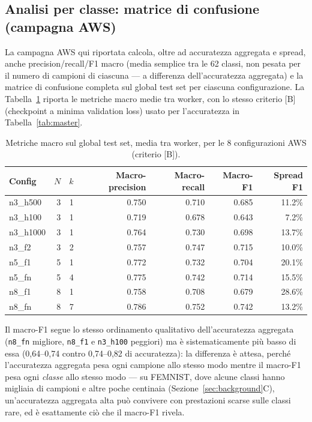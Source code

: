 \subsection{Analisi per classe: matrice di confusione (campagna AWS)}
La campagna AWS qui riportata calcola, oltre ad accuratezza aggregata e
spread, anche precision/recall/F1 macro (media semplice tra le 62 classi,
non pesata per il numero di campioni di ciascuna — a differenza
dell'accuratezza aggregata) e la matrice di confusione completa
sul global test set per ciascuna configurazione. La
Tabella~\ref{tab:macro} riporta le metriche macro medie tra worker, con lo
stesso criterio [B] (checkpoint a minima validation loss) usato per
l'accuratezza in Tabella~\ref{tab:master}.

\begin{table}[t]
  \centering
  \caption{Metriche macro sul global test set, media tra worker, per le 8 configurazioni AWS (criterio [B]).}
  \label{tab:macro}
  \scriptsize
  \begin{tabular}{lrrrrrr}
    \toprule
    \textbf{Config} & $N$ & $k$ & \textbf{Macro-precision} & \textbf{Macro-recall} & \textbf{Macro-F1} & \textbf{Spread F1} \\
    \midrule
    n3\_h500  & 3 & 1 & 0.750 & 0.710 & 0.685 & 11.2\% \\
    n3\_h100  & 3 & 1 & 0.719 & 0.678 & 0.643 & 7.2\%  \\
    n3\_h1000 & 3 & 1 & 0.764 & 0.730 & 0.698 & 13.7\% \\
    n3\_f2    & 3 & 2 & 0.757 & 0.747 & 0.715 & 10.0\% \\
    n5\_f1    & 5 & 1 & 0.772 & 0.732 & 0.704 & 20.1\% \\
    n5\_fn    & 5 & 4 & 0.775 & 0.742 & 0.714 & 15.5\% \\
    n8\_f1    & 8 & 1 & 0.758 & 0.708 & 0.679 & 28.6\% \\
    n8\_fn    & 8 & 7 & 0.786 & 0.752 & 0.742 & 13.2\% \\
    \bottomrule
  \end{tabular}
\end{table}

Il macro-F1 segue lo stesso ordinamento qualitativo dell'accuratezza
aggregata (\texttt{n8\_fn} migliore, \texttt{n8\_f1} e \texttt{n3\_h100}
peggiori) ma è sistematicamente più basso di essa (0,64--0,74 contro
0,74--0,82 di accuratezza): la differenza è attesa, perché l'accuratezza
aggregata pesa ogni campione allo stesso modo mentre il macro-F1 pesa ogni
\emph{classe} allo stesso modo — su FEMNIST, dove alcune classi hanno
migliaia di campioni e altre poche centinaia (Sezione~\ref{sec:background}C),
un'accuratezza aggregata alta può convivere con prestazioni scarse sulle
classi rare, ed è esattamente ciò che il macro-F1 rivela.

